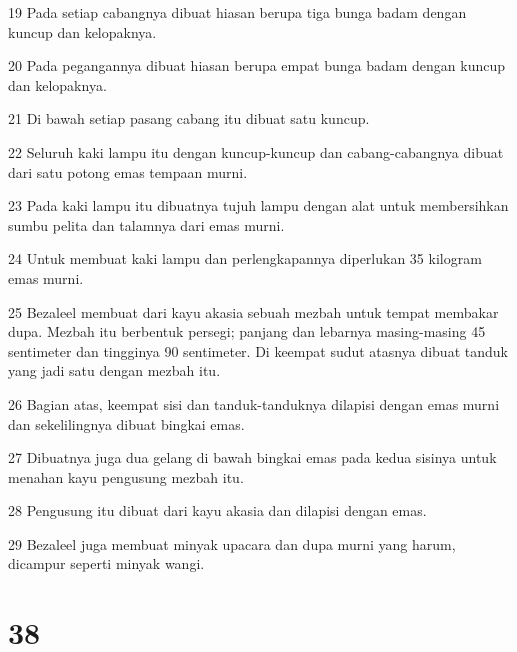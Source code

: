 \par 19 Pada setiap cabangnya dibuat hiasan berupa tiga bunga badam dengan kuncup dan kelopaknya.
\par 20 Pada pegangannya dibuat hiasan berupa empat bunga badam dengan kuncup dan kelopaknya.
\par 21 Di bawah setiap pasang cabang itu dibuat satu kuncup.
\par 22 Seluruh kaki lampu itu dengan kuncup-kuncup dan cabang-cabangnya dibuat dari satu potong emas tempaan murni.
\par 23 Pada kaki lampu itu dibuatnya tujuh lampu dengan alat untuk membersihkan sumbu pelita dan talamnya dari emas murni.
\par 24 Untuk membuat kaki lampu dan perlengkapannya diperlukan 35 kilogram emas murni.
\par 25 Bezaleel membuat dari kayu akasia sebuah mezbah untuk tempat membakar dupa. Mezbah itu berbentuk persegi; panjang dan lebarnya masing-masing 45 sentimeter dan tingginya 90 sentimeter. Di keempat sudut atasnya dibuat tanduk yang jadi satu dengan mezbah itu.
\par 26 Bagian atas, keempat sisi dan tanduk-tanduknya dilapisi dengan emas murni dan sekelilingnya dibuat bingkai emas.
\par 27 Dibuatnya juga dua gelang di bawah bingkai emas pada kedua sisinya untuk menahan kayu pengusung mezbah itu.
\par 28 Pengusung itu dibuat dari kayu akasia dan dilapisi dengan emas.
\par 29 Bezaleel juga membuat minyak upacara dan dupa murni yang harum, dicampur seperti minyak wangi.

\chapter{38}

